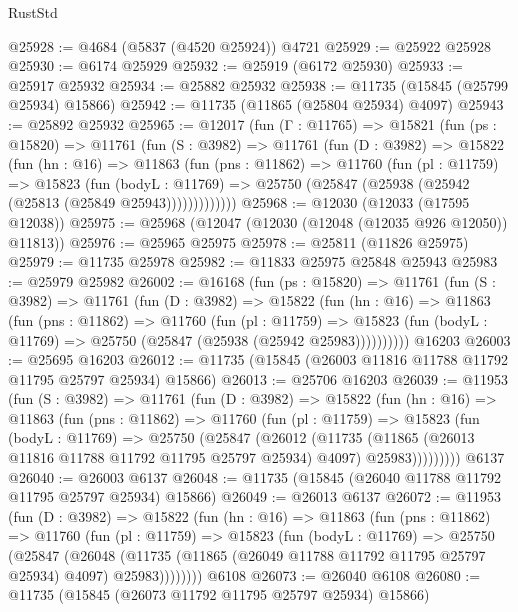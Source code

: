\begin{lexlean}{RustStd}
\begin{coremodule}
@25928 := @4684 (@5837 (@4520 @25924)) @4721
@25929 := @25922 @25928
@25930 := @6174 @25929
@25932 := @25919 (@6172 @25930)
@25933 := @25917 @25932
@25934 := @25882 @25932
@25938 := @11735 (@15845 (@25799 @25934) @15866)
@25942 := @11735 (@11865 (@25804 @25934) @4097)
@25943 := @25892 @25932
@25965 := @12017
    (fun (Γ : @11765) =>
    @15821
      (fun (ps : @15820) =>
      @11761
        (fun (S : @3982) =>
        @11761
          (fun (D : @3982) =>
          @15822
            (fun (hn : @16) =>
            @11863
              (fun (pns : @11862) =>
              @11760
                (fun (pl : @11759) =>
                @15823
                  (fun (bodyL : @11769) =>
                  @25750 (@25847 (@25938 (@25942 (@25813 (@25849 @25943)))))))))))))
@25968 := @12030 (@12033 (@17595 @12038))
@25975 := @25968 (@12047 (@12030 (@12048 (@12035 @926 @12050)) @11813))
@25976 := @25965 @25975
@25978 := @25811 (@11826 @25975)
@25979 := @11735 @25978
@25982 := @11833 @25975 @25848 @25943
@25983 := @25979 @25982
@26002 := @16168
    (fun (ps : @15820) =>
    @11761
      (fun (S : @3982) =>
      @11761
        (fun (D : @3982) =>
        @15822
          (fun (hn : @16) =>
          @11863
            (fun (pns : @11862) =>
            @11760
              (fun (pl : @11759) =>
              @15823 (fun (bodyL : @11769) => @25750 (@25847 (@25938 (@25942 @25983))))))))))
    @16203
@26003 := @25695 @16203
@26012 := @11735 (@15845 (@26003 @11816 @11788 @11792 @11795 @25797 @25934) @15866)
@26013 := @25706 @16203
@26039 := @11953
    (fun (S : @3982) =>
    @11761
      (fun (D : @3982) =>
      @15822
        (fun (hn : @16) =>
        @11863
          (fun (pns : @11862) =>
          @11760
            (fun (pl : @11759) =>
            @15823
              (fun (bodyL : @11769) =>
              @25750
                (@25847
                  (@26012
                    (@11735
                      (@11865 (@26013 @11816 @11788 @11792 @11795 @25797 @25934) @4097)
                      @25983)))))))))
    @6137
@26040 := @26003 @6137
@26048 := @11735 (@15845 (@26040 @11788 @11792 @11795 @25797 @25934) @15866)
@26049 := @26013 @6137
@26072 := @11953
    (fun (D : @3982) =>
    @15822
      (fun (hn : @16) =>
      @11863
        (fun (pns : @11862) =>
        @11760
          (fun (pl : @11759) =>
          @15823
            (fun (bodyL : @11769) =>
            @25750
              (@25847
                (@26048
                  (@11735 (@11865 (@26049 @11788 @11792 @11795 @25797 @25934) @4097) @25983))))))))
    @6108
@26073 := @26040 @6108
@26080 := @11735 (@15845 (@26073 @11792 @11795 @25797 @25934) @15866)

\end{coremodule}
\end{lexlean}
